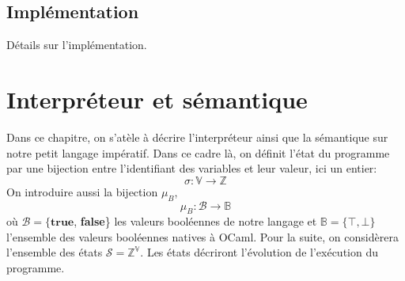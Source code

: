 \documentclass[a4paper, 12pt]{article}
\begin{document}
\begin{center}
\end{center}

\subsection{Implémentation}
Détails sur l'implémentation.

\section{Interpréteur et sémantique}
Dans ce chapitre, on s'atèle à décrire l'interpréteur ainsi que la sémantique sur notre petit langage impératif. 
Dans ce cadre là, on définit l'état du programme par une bijection entre l'identifiant des variables et leur valeur, 
ici un entier:
$$\sigma : \mathbb{V} \longrightarrow \mathbb{Z}$$
On introduire aussi la bijection $\mu_B$,
$$\mu_B : \mathcal{B} \longrightarrow \mathbb{B}$$
où $\mathcal{B} = \{\textbf{true}$, \textbf{false}\} les valeurs booléennes de notre langage et $\mathbb{B} = \{\top, \bot\}$ 
l'ensemble des valeurs booléennes natives à OCaml. Pour la suite, on considèrera l'ensemble des états $\mathcal{S} = \mathbb{Z}^\mathbb{V}$.
Les états décriront l'évolution de l'exécution du programme.
\end{document}
